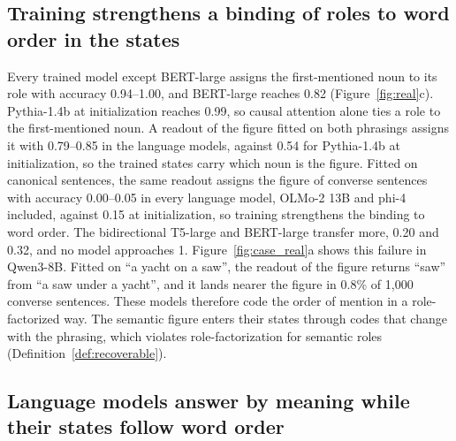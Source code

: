 \documentclass[10pt]{article}
\theoremstyle{plain}
\theoremstyle{remark}
\begin{document}
\subsection{Training strengthens a binding of roles to word order in the states}
\label{sec:roles}

Every trained model except BERT-large assigns the first-mentioned noun to its role with accuracy 0.94--1.00, and BERT-large reaches 0.82 (Figure~\ref{fig:real}c). Pythia-1.4b at initialization reaches 0.99, so causal attention alone ties a role to the first-mentioned noun. A readout of the figure fitted on both phrasings assigns it with 0.79--0.85 in the language models, against 0.54 for Pythia-1.4b at initialization, so the trained states carry which noun is the figure. Fitted on canonical sentences, the same readout assigns the figure of converse sentences with accuracy 0.00--0.05 in every language model, OLMo-2 13B and phi-4 included, against 0.15 at initialization, so training strengthens the binding to word order. The bidirectional T5-large and BERT-large transfer more, 0.20 and 0.32, and no model approaches 1. Figure~\ref{fig:case_real}a shows this failure in Qwen3-8B. Fitted on ``a yacht on a saw'', the readout of the figure returns ``saw'' from ``a saw under a yacht'', and it lands nearer the figure in 0.8\% of 1{,}000 converse sentences. These models therefore code the order of mention in a role-factorized way. The semantic figure enters their states through codes that change with the phrasing, which violates role-factorization for semantic roles (Definition~\ref{def:recoverable}).

\subsection{Language models answer by meaning while their states follow word order}
\label{sec:behavior}
\end{document}
